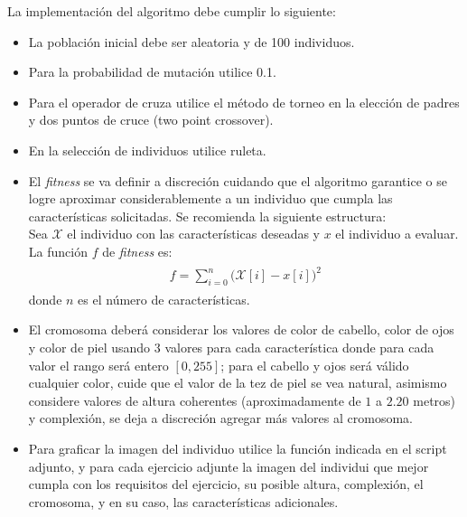\documentclass[10pt,letterpaper]{article}
\begin{document}
\begin{enumerate}
    La implementación del algoritmo debe cumplir lo siguiente:
        \begin{itemize}
            \item La población inicial debe ser aleatoria y de 100 individuos.
            \item Para la probabilidad de mutación utilice 0.1.
            \item Para el operador de cruza utilice el método de torneo en la
                  elección de padres y dos puntos de cruce (two point crossover).
            \item En la selección de individuos utilice ruleta.
            \item El \textit{fitness} se va definir a discreción cuidando que el
                  algoritmo garantice o se logre aproximar considerablemente a un individuo
                  que cumpla las características solicitadas. Se recomienda la siguiente estructura:\\[\baselineskip]
                  Sea $\mathcal{X}$ el individuo con las características deseadas y $x$ el individuo a evaluar.
                  La función $f$ de \textit{fitness} es:
                    \begin{equation*} \begin{split} \begin{gathered}
                        f = \sum_{i=0}^{n} \big( \mathcal{X}[i] - x[i] \big)^2
                    \end{gathered} \end{split} \end{equation*}
                  donde $n$ es el número de características.
            \item El cromosoma deberá considerar los valores de color de cabello, color
                  de ojos y color de piel usando 3 valores para cada característica donde para cada
                  valor el rango será entero $[0, 255]$; para el cabello y ojos será válido cualquier
                  color, cuide que el valor de la tez de piel se vea natural, asimismo considere
                  valores de altura coherentes (aproximadamente de $1$ a $2.20$ metros) y complexión,
                  se deja a discreción agregar más valores al cromosoma.
            \item Para graficar la imagen del individuo utilice la función indicada en el script
                  adjunto, y para cada ejercicio adjunte la imagen del individui que mejor cumpla
                  con los requisitos del ejercicio, su posible altura, complexión, el cromosoma, y
                  en su caso, las características adicionales.
        \end{itemize}
\end{enumerate}
\clearpage
\end{document}
